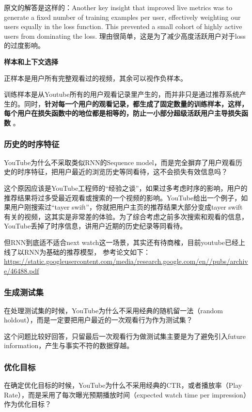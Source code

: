 \documentclass[12pt]{article}
\begin{document}
原文的解答是这样的：Another key insight that improved live metrics was to generate a fixed number of training examples per user, effectively weighting our users equally in the loss function. This prevented a small cohort of highly active users from dominating the loss. 理由很简单，这是为了减少高度活跃用户对于loss的过度影响。

\begin{framed}
\textbf{样本和上下文选择}

正样本是用户所有完整观看过的视频，其余可以视作负样本。

训练样本是从Youtube所有的用户观看记录里产生的，而并非只是通过推荐系统产生的。同时，\textbf{针对每一个用户的观看记录，都生成了固定数量的训练样本，这样，每个用户在损失函数中的地位都是相等的，防止一小部分超级活跃用户主导损失函数} 。
\end{framed}

\subsubsection{历史的时序特征}
YouTube为什么不采取类似RNN的Sequence model，而是完全摒弃了用户观看历史的时序特征，把用户最近的浏览历史等同看待，这不会损失有效信息吗？

这个原因应该是YouTube工程师的“经验之谈”，如果过多考虑时序的影响，用户的推荐结果将过多受最近观看或搜索的一个视频的影响。YouTube给出一个例子，如果用户刚搜索过“tayer swift”，你就把用户主页的推荐结果大部分变成tayer swift有关的视频，这其实是非常差的体验。为了综合考虑之前多次搜索和观看的信息，YouTube丢掉了时序信息，讲用户近期的历史纪录等同看待。

但RNN到底适不适合next watch这一场景，其实还有待商榷，目前youtube已经上线了以RNN为基础的推荐模型， 参考论文如下： \url{https://static.googleusercontent.com/media/research.google.com/en//pubs/archive/46488.pdf}

\subsubsection{生成测试集}
在处理测试集的时候，YouTube为什么不采用经典的随机留一法（random holdout），而是一定要把用户最近的一次观看行为作为测试集？

这个问题比较好回答，只留最后一次观看行为做测试集主要是为了避免引入future information，产生与事实不符的数据穿越。

\subsubsection{优化目标}
在确定优化目标的时候，YouTube为什么不采用经典的CTR，或者播放率（Play Rate），而是采用了每次曝光预期播放时间（expected watch time per impression）作为优化目标？
\end{document}

